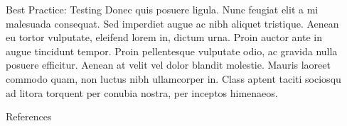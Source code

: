 \documentclass[final]{beamer}
\newlength{\sepwidth}
\newlength{\colwidth}
\newcommand{\separatorcolumn}{\begin{column}{\sepwidth}\end{column}}
\begin{document}
\begin{frame}[t]
\begin{columns}[t]
\begin{column}{\colwidth}
\begin{block}{Best Practice: Testing}
    Donec quis posuere ligula. Nunc feugiat elit a mi malesuada consequat. Sed
    imperdiet augue ac nibh aliquet tristique. Aenean eu tortor vulputate,
    eleifend lorem in, dictum urna. Proin auctor ante in augue tincidunt
    tempor. Proin pellentesque vulputate odio, ac gravida nulla posuere
    efficitur. Aenean at velit vel dolor blandit molestie. Mauris laoreet
    commodo quam, non luctus nibh ullamcorper in. Class aptent taciti sociosqu
    ad litora torquent per conubia nostra, per inceptos himenaeos.

  \end{block}

  \begin{block}{References}

    \nocite{*}
    \footnotesize{}

  \end{block}

\end{column}

\separatorcolumn
\end{columns}
\end{frame}
\end{document}

